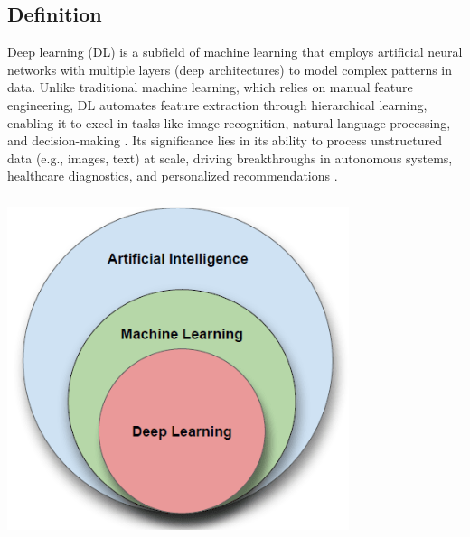 \documentclass[a4paper,12pt]{report}
\begin{document}
\begin{spacing}{1.5}
    \section{Definition}
    Deep learning (DL) is a subfield of machine learning that employs artificial neural networks with multiple layers (deep architectures) to model complex patterns in data. Unlike traditional machine learning, which relies on manual feature engineering, DL automates feature extraction through hierarchical learning, enabling it to excel in tasks like image recognition, natural language processing, and decision-making \cite{dl}. Its significance lies in its ability to process unstructured data (e.g., images, text) at scale, driving breakthroughs in autonomous systems, healthcare diagnostics, and personalized recommendations \cite{dl2}.

    \begin{minipage}[lH]{0.8\textwidth}
        \centering
        \includegraphics[width=10cm, height=10cm]{Pics/deepLearning.png}
    \end{minipage} 
    \hspace{1cm}
    \begin{minipage}[rH]{0.1\textwidth}
        \cite{dlImg}    
    \end{minipage}
    
    \vspace{0.5cm}


\end{spacing}
\end{document}
